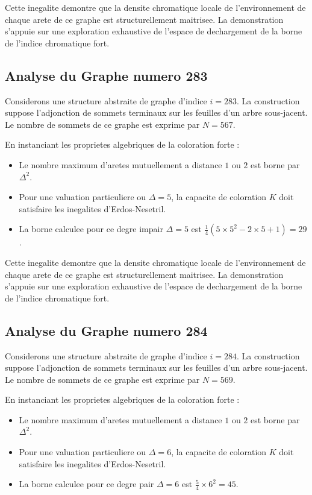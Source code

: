 \documentclass[11pt,a4paper]{article}
\begin{document}
Cette inegalite demontre que la densite chromatique locale de l'environnement de chaque arete de ce graphe est structurellement maitrisee. La demonstration s'appuie sur une exploration exhaustive de l'espace de dechargement de la borne de l'indice chromatique fort.

\subsection{Analyse du Graphe numero 283}
Considerons une structure abstraite de graphe d'indice $i = 283$. La construction suppose l'adjonction de sommets terminaux sur les feuilles d'un arbre sous-jacent. Le nombre de sommets de ce graphe est exprime par $N = 567$.

En instanciant les proprietes algebriques de la coloration forte :
\begin{itemize}
\item Le nombre maximum d'aretes mutuellement a distance $1$ ou $2$ est borne par $\Delta^2$.
\item Pour une valuation particuliere ou $\Delta = 5$, la capacite de coloration $K$ doit satisfaire les inegalites d'Erdos-Nesetril.
\item La borne calculee pour ce degre impair $\Delta = 5$ est $\frac{1}{4}(5 \times 5^2 - 2 \times 5 + 1) = 29$.
\end{itemize}

Cette inegalite demontre que la densite chromatique locale de l'environnement de chaque arete de ce graphe est structurellement maitrisee. La demonstration s'appuie sur une exploration exhaustive de l'espace de dechargement de la borne de l'indice chromatique fort.

\subsection{Analyse du Graphe numero 284}
Considerons une structure abstraite de graphe d'indice $i = 284$. La construction suppose l'adjonction de sommets terminaux sur les feuilles d'un arbre sous-jacent. Le nombre de sommets de ce graphe est exprime par $N = 569$.

En instanciant les proprietes algebriques de la coloration forte :
\begin{itemize}
\item Le nombre maximum d'aretes mutuellement a distance $1$ ou $2$ est borne par $\Delta^2$.
\item Pour une valuation particuliere ou $\Delta = 6$, la capacite de coloration $K$ doit satisfaire les inegalites d'Erdos-Nesetril.
\item La borne calculee pour ce degre pair $\Delta = 6$ est $\frac{5}{4} \times 6^2 = 45$.
\end{itemize}
\end{document}
